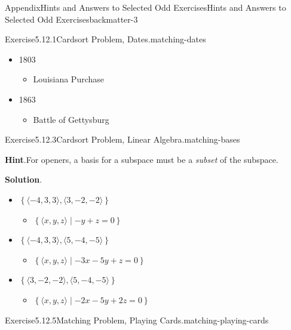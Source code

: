 \documentclass[oneside,10pt,]{book}
\newcommand{\blocktitlefont}{\relax}
\numberwithin{equation}{section}
\begin{document}
\begin{solutions-chapter}{Appendix}{Hints and Answers to Selected Odd Exercises}{}{Hints and Answers to Selected Odd Exercises}{}{}{backmatter-3}
\begin{divisionsolution}{Exercise}{5.12.1}{Cardsort Problem, Dates.}{matching-dates}
\begin{itemize}[label=\textbullet]
\begin{itemize}[label=$\circ$]
\end{itemize}
%
\item{}1803%
\begin{itemize}[label=$\circ$]
\item{}Louisiana Purchase%
\end{itemize}
%
\item{}1863%
\begin{itemize}[label=$\circ$]
\item{}Battle of Gettysburg%
\end{itemize}
%
\end{itemize}
%
\end{divisionsolution}%
\begin{divisionsolution}{Exercise}{5.12.3}{Cardsort Problem, Linear Algebra.}{matching-bases}%
\par\smallskip%
\noindent\textbf{\blocktitlefont Hint}.\hypertarget{matching-bases-4-back}{}\quad{}For openers, a basis for a subspace must be a \emph{subset} of the subspace.%
\par\smallskip%
\noindent\textbf{\blocktitlefont Solution}.\hypertarget{matching-bases-5-back}{}\quad{}%
\begin{itemize}[label=\textbullet]
\item{}\(\left\{\langle -4, 3, 3\rangle, \langle 3, -2, -2 \rangle\right\}\)%
\begin{itemize}[label=$\circ$]
\item{}\(\left\{\langle x,y,z\rangle\mid - y + z = 0\right\}\)%
\end{itemize}
%
\item{}\(\left\{\langle -4, 3, 3\rangle, \langle 5, -4, -5 \rangle\right\}\)%
\begin{itemize}[label=$\circ$]
\item{}\(\left\{\langle x,y,z\rangle\mid -3x - 5y + z = 0\right\}\)%
\end{itemize}
%
\item{}\(\left\{\langle 3, -2, -2 \rangle, \langle 5, -4, -5 \rangle\right\}\)%
\begin{itemize}[label=$\circ$]
\item{}\(\left\{\langle x,y,z\rangle\mid -2x - 5y + 2z = 0\right\}\)%
\end{itemize}
%
\end{itemize}
%
\end{divisionsolution}%
\begin{divisionsolution}{Exercise}{5.12.5}{Matching Problem, Playing Cards.}{matching-playing-cards}%
\par\smallskip%

\end{divisionsolution}
\end{solutions-chapter}
\end{document}
